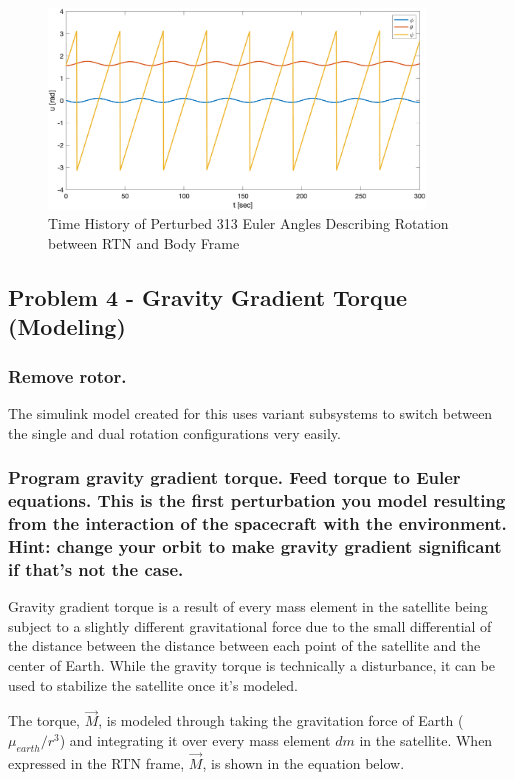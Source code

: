 \begin{figure}[H]
    \centering
    \captionsetup{justification = centering}
    \includegraphics[width = 10cm]{Images/PS4/mom_wheel_mission_stability_history_angles.png}
    \caption{Time History of Perturbed 313 Euler Angles Describing Rotation between RTN and Body Frame}
    \label{fig:mom_wheel_mission_stability_angles}
\end{figure}

\subsection{Problem 4 - Gravity Gradient Torque (Modeling)}

\subsubsection{Remove rotor.}

The simulink model created for this uses variant subsystems to switch between the single and dual rotation configurations very easily.

\subsubsection{Program gravity gradient torque. Feed torque to Euler equations. This is the first perturbation you
model resulting from the interaction of the spacecraft with the environment. Hint: change your orbit
to make gravity gradient significant if that’s not the case.}

Gravity gradient torque is a result of every mass element in the satellite being subject to a slightly different gravitational force due to the small differential of the distance between the distance between each point of the satellite and the center of Earth. While the gravity torque is technically a disturbance, it can be used to stabilize the satellite once it's modeled. 

The torque, $\Vec{M}$, is modeled through taking the gravitation force of Earth ($\mu_{earth} / r^3$) and integrating it over every mass element $dm$ in the satellite. When expressed in the RTN frame, $\Vec{M}$, is shown in the equation below.

